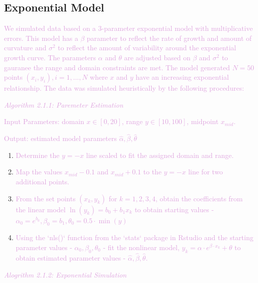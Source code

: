 \documentclass[]{interact}
\theoremstyle{plain}%
\theoremstyle{definition}
\theoremstyle{remark}
\begin{document}
\hypertarget{exponential-model}{%
\subsection{Exponential Model}\label{exponential-model}}

\textcolor{Plum}{
We simulated data based on a 3-parameter exponential model with multiplicative errors. 
This model has a $\beta$ parameter to reflect the rate of growth and amount of curvature and $\sigma^2$ to reflect the amount of variability around the exponential growth curve. 
The parameters $\alpha$ and $\theta$ are adjusted based on $\beta$ and $\sigma^2$ to gauranee the range and domain constraints are met. 
The model generated $N = 50$ points $(x_i, y_i), i = 1,...,N$ where $x$ and $y$ have an increasing exponential relationship. 
The data was simulated heuristically by the following procedures:
}
\vspace{3 mm}

\textcolor{Plum}{\textit{Algorithm 2.1.1: Paremeter Estimation}}

\textcolor{Plum}{Input Parameters: domain $x\in[0,20]$, range $y\in[10,100]$, midpoint $x_{mid}$.}

\textcolor{Plum}{Output: estimated model parameters $\hat\alpha, \hat\beta, \hat\theta$}

\begin{enumerate}
\def\labelenumi{\arabic{enumi}.}
\item
  \textcolor{Plum}{Determine the $y=-x$ line scaled to fit the assigned domain and range.}
\item
  \textcolor{Plum}{Map the values $x_{mid} - 0.1$ and $x_{mid} + 0.1$ to the $y=-x$ line for two additional points.}
\item
  \textcolor{Plum}{From the set points $(x_k, y_k)$ for $k = 1,2,3,4$, obtain the coefficients from the linear model $\ln(y_k) = b_0 +b_1x_k$ to obtain starting values - $\alpha_0 = e^{b_0}, \beta_0 =  b_1, \theta_0 = 0.5\cdot \min(y)$}
\item
  \textcolor{Plum}{Using the `nls()` function from the `stats` package in Rstudio and the starting parameter values - $\alpha_0, \beta_0, \theta_0$ - fit the nonlinear model, $y_k = \alpha\cdot e^{\beta\cdot x_k}+\theta$ to obtain estimated parameter values - $\hat\alpha, \hat\beta, \hat\theta.$}
\end{enumerate}

\textcolor{Plum}{\textit{Alogrithm 2.1.2: Exponential Simulation}}
\end{document}
